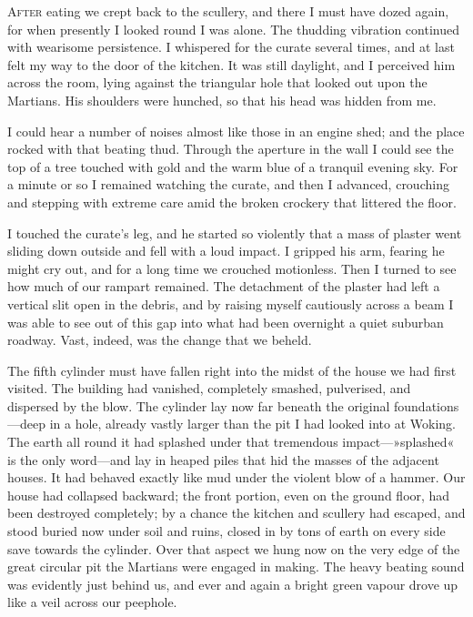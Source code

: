 

\lettrine[lines=4,findent=2pt]{A}{fter} eating we crept back to the scullery, and there I must have dozed again, for when presently I looked round I was alone. The thudding vibration continued with wearisome persistence. I whispered for the curate several times, and at last felt my way to the door of the kitchen. It was still daylight, and I perceived him across the room, lying against the triangular hole that looked out upon the Martians. His shoulders were hunched, so that his head was hidden from me.

I could hear a number of noises almost like those in an engine shed; and the place rocked with that beating thud. Through the aperture in the wall I could see the top of a tree touched with gold and the warm blue of a tranquil evening sky. For a minute or so I remained watching the curate, and then I advanced, crouching and stepping with extreme care amid the broken crockery that littered the floor.

I touched the curate's leg, and he started so violently that a mass of plaster went sliding down outside and fell with a loud impact. I gripped his arm, fearing he might cry out, and for a long time we crouched motionless. Then I turned to see how much of our rampart remained. The detachment of the plaster had left a vertical slit open in the debris, and by raising myself cautiously across a beam I was able to see out of this gap into what had been overnight a quiet suburban roadway. Vast, indeed, was the change that we beheld.

The fifth cylinder must have fallen right into the midst of the house we had first visited. The building had vanished, completely smashed, pulverised, and dispersed by the blow. The cylinder lay now far beneath the original foundations—deep in a hole, already vastly larger than the pit I had looked into at Woking. The earth all round it had splashed under that tremendous impact—»splashed« is the only word—and lay in heaped piles that hid the masses of the adjacent houses. It had behaved exactly like mud under the violent blow of a hammer. Our house had collapsed backward; the front portion, even on the ground floor, had been destroyed completely; by a chance the kitchen and scullery had escaped, and stood buried now under soil and ruins, closed in by tons of earth on every side save towards the cylinder. Over that aspect we hung now on the very edge of the great circular pit the Martians were engaged in making. The heavy beating sound was evidently just behind us, and ever and again a bright green vapour drove up like a veil across our peephole.

